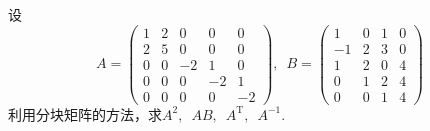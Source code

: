 \begin{example}
    设\[A=\begin{pmatrix}
            1 & 2 & 0  & 0  & 0  \\
            2 & 5 & 0  & 0  & 0  \\
            0 & 0 & -2 & 1  & 0  \\
            0 & 0 & 0  & -2 & 1  \\
            0 & 0 & 0  & 0  & -2
        \end{pmatrix},\enspace B=\begin{pmatrix}
            1  & 0 & 1 & 0 \\
            -1 & 2 & 3 & 0 \\
            1  & 2 & 0 & 4 \\
            0  & 1 & 2 & 4 \\
            0  & 0 & 1 & 4
        \end{pmatrix}\]
    利用分块矩阵的方法，求$A^2,\enspace AB,\enspace A^\mathrm{T},\enspace A^{-1}$.
\end{example}

